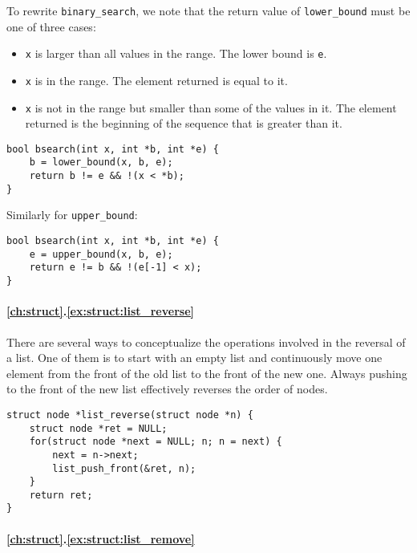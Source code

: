 

To rewrite \texttt{binary\_search}, we note that the return value of
\texttt{lower\_bound} must be one of three cases:

\begin{itemize}
    \item
        \texttt{x} is larger than all values in the range.  The lower bound is
        \texttt{e}.
    \item \texttt{x} is in the range.  The element returned is equal to it.
    \item
        \texttt{x} is not in the range but smaller than some of the values in
        it.  The element returned is the beginning of the sequence that is
        greater than it.
\end{itemize}

\begin{lstlisting}[style=c]
bool bsearch(int x, int *b, int *e) {
    b = lower_bound(x, b, e);
    return b != e && !(x < *b);
}
\end{lstlisting}

Similarly for \texttt{upper\_bound}:

\begin{lstlisting}[style=c]
bool bsearch(int x, int *b, int *e) {
    e = upper_bound(x, b, e);
    return e != b && !(e[-1] < x);
}
\end{lstlisting}

\paragraph{\ref{ch:struct}.\ref{ex:struct:list_reverse}}

There are several ways to conceptualize the operations involved in the reversal
of a list.  One of them is to start with an empty list and continuously move one
element from the front of the old list to the front of the new one.  Always
pushing to the front of the new list effectively reverses the order of nodes.

\begin{lstlisting}[style=c]
struct node *list_reverse(struct node *n) {
    struct node *ret = NULL;
    for(struct node *next = NULL; n; n = next) {
        next = n->next;
        list_push_front(&ret, n);
    }
    return ret;
}
\end{lstlisting}

\paragraph{\ref{ch:struct}.\ref{ex:struct:list_remove}}

